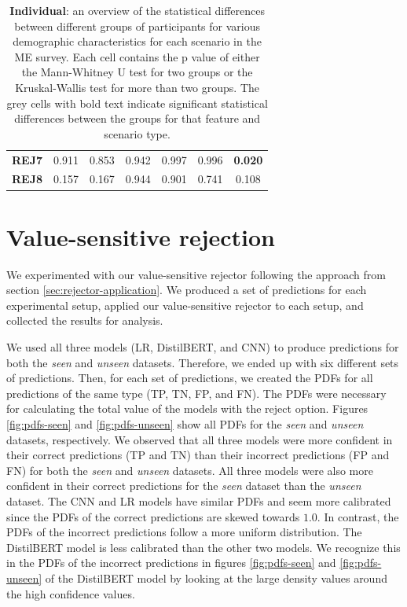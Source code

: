 \begin{table}
\begin{tabular}{lccc|ccc}
        \textbf{REJ7} & 0.911                                   & 0.853                                             & 0.942                                  & 0.997                                    & 0.996                                  & \cellcolor[HTML]{EFEFEF}\textbf{0.020} \\
        \textbf{REJ8} & 0.157                                   & 0.167                                             & 0.944                                  & 0.901                                    & 0.741                                  & 0.108                                  \\
        \bottomrule
    \end{tabular}
    \caption{\textbf{Individual}: an overview of the statistical differences between different groups of participants for various demographic characteristics for each scenario in the ME survey. Each cell contains the p value of either the Mann-Whitney U test for two groups or the Kruskal-Wallis test for more than two groups. The grey cells with bold text indicate significant statistical differences between the groups for that feature and scenario type.}
    \label{tab:results-differences-ind}
\end{table}

\section{Value-sensitive rejection}
\label{sec:results-rejector}
We experimented with our value-sensitive rejector following the approach from section \ref{sec:rejector-application}.
%
We produced a set of predictions for each experimental setup, applied our value-sensitive rejector to each setup, and collected the results for analysis.
%

%
We used all three models (LR, DistilBERT, and CNN) to produce predictions for both the \emph{seen} and \emph{unseen} datasets.
%
Therefore, we ended up with six different sets of predictions.
%
Then, for each set of predictions, we created the PDFs for all predictions of the same type (TP, TN, FP, and FN).
%
The PDFs were necessary for calculating the total value of the models with the reject option.
%
Figures \ref{fig:pdfs-seen} and \ref{fig:pdfs-unseen} show all PDFs for the \emph{seen} and \emph{unseen} datasets, respectively.
%
We observed that all three models were more confident in their correct predictions (TP and TN) than their incorrect predictions (FP and FN) for both the \emph{seen} and \emph{unseen} datasets.
%
All three models were also more confident in their correct predictions for the \emph{seen} dataset than the \emph{unseen} dataset.
%
The CNN and LR models have similar PDFs and seem more calibrated since the PDFs of the correct predictions are skewed towards $1.0$.
%
In contrast, the PDFs of the incorrect predictions follow a more uniform distribution.
%
The DistilBERT model is less calibrated than the other two models.
%
We recognize this in the PDFs of the incorrect predictions in figures \ref{fig:pdfs-seen} and \ref{fig:pdfs-unseen} of the DistilBERT model by looking at the large density values around the high confidence values.
%

